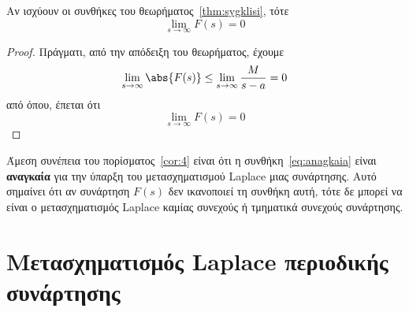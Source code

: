 \begin{cor}\label{cor:4}
  Αν ισχύουν οι συνθήκες του θεωρήματος~\ref{thm:sygklisi}, τότε
  \begin{equation}\label{eq:anagkaia}
    \lim_{s \to \infty} F(s) = 0 
  \end{equation} 
\end{cor}
\begin{proof}
  Πράγματι, από την απόδειξη του θεωρήματος, έχουμε
  \[
    \lim_{s \to \infty} \abs{F(s)} \leq \lim_{s \to \infty} \frac{M}{s-a} = 0
  \] 
  από όπου, έπεται ότι
  \[
    \lim_{s \to \infty} F(s) = 0 
  \]
\end{proof}
\begin{rem}
  Άμεση συνέπεια του πορίσματος~\ref{cor:4} είναι ότι η συνθήκη~\eqref{eq:anagkaia} 
  είναι \textbf{αναγκαία} για την ύπαρξη του μετασχηματισμού Laplace μιας συνάρτησης. 
  Αυτό σημαίνει ότι αν συνάρτηση $F(s)$ δεν ικανοποιεί τη συνθήκη αυτή, τότε δε 
  μπορεί να είναι ο μετασχηματισμός Laplace καμίας συνεχούς ή τμηματικά συνεχούς 
  συνάρτησης.
\end{rem}

\section*{Μετασχηματισμός Laplace περιοδικής συνάρτησης}

